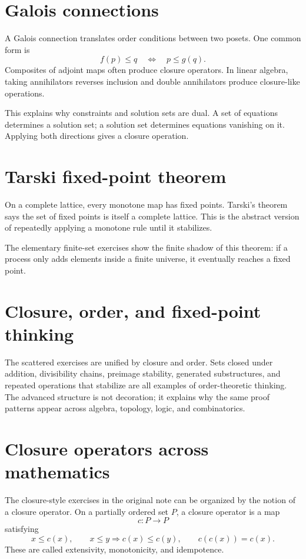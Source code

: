 \section{Galois connections}

A Galois connection translates order conditions between two posets.  One common form is
\[
  f(p)\le q\quad\Longleftrightarrow\quad p\le g(q).
\]
Composites of adjoint maps often produce closure operators.  In linear algebra, taking annihilators reverses inclusion and double annihilators produce closure-like operations.

This explains why constraints and solution sets are dual.  A set of equations determines a solution set; a solution set determines equations vanishing on it.  Applying both directions gives a closure operation.

\section{Tarski fixed-point theorem}

On a complete lattice, every monotone map has fixed points.  Tarski's theorem says the set of fixed points is itself a complete lattice.  This is the abstract version of repeatedly applying a monotone rule until it stabilizes.

The elementary finite-set exercises show the finite shadow of this theorem: if a process only adds elements inside a finite universe, it eventually reaches a fixed point.

\section{Closure, order, and fixed-point thinking}

The scattered exercises are unified by closure and order.  Sets closed under addition, divisibility chains, preimage stability, generated substructures, and repeated operations that stabilize are all examples of order-theoretic thinking.  The advanced structure is not decoration; it explains why the same proof patterns appear across algebra, topology, logic, and combinatorics.

\section{Closure operators across mathematics}

The closure-style exercises in the original note can be organized by the notion of a closure operator.  On a partially ordered set $P$, a closure operator is a map
\[
  c:P\to P
\]
satisfying
\[
  x\le c(x),\qquad x\le y\Rightarrow c(x)\le c(y),\qquad c(c(x))=c(x).
\]
These are called extensivity, monotonicity, and idempotence.

